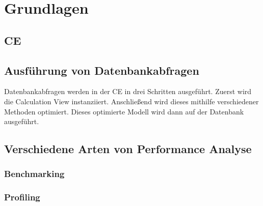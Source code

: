 \chapter{Grundlagen}
\section{\acl{CE}}
\section{Ausführung von Datenbankabfragen}
Datenbankabfragen werden in der  \ac{CE} in drei Schritten ausgeführt. Zuerst
wird die Calculation View instanziiert. Anschließend wird dieses mithilfe
verschiedener Methoden optimiert. Dieses optimierte Modell wird dann auf der
Datenbank ausgeführt.
\section{Verschiedene Arten von Performance Analyse}
\subsection*{Benchmarking}
\subsection*{Profiling}
